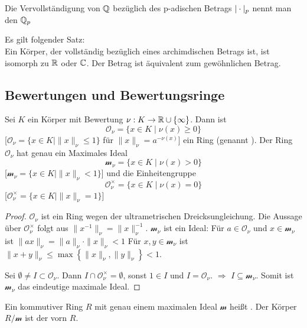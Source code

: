\documentclass[../main.tex]{subfiles}
\begin{document}
\begin{definition}
    Die Vervollständigung von $\mathbb{Q}$ bezüglich des p-adischen Betrags $|\cdot|_p$ nennt man den  $\mathbb{Q}_p$
\end{definition}

\begin{remark}
    Es gilt folgender Satz:\\
    Ein Körper, der vollständig bezüglich eines archimdischen Betrags ist, ist isomorph zu $\mathbb{R}$ oder $\mathbb{C}$. Der Betrag ist äquivalent zum gewöhnlichen Betrag.
\end{remark}

\subsection{Bewertungen und Bewertungsringe}
\begin{theorem}\label{theo:4.23}
    Sei $K$ ein Körper mit Bewertung $\nu:K\rightarrow\mathbb{R}\cup \{\infty\}$.
    Dann ist $$\mathcal{O}_\nu = \{x\in K\mid \nu(x)\geq0\}$$ [$\mathcal{O}_\nu = \{x\in K\mid \|x\|_\nu \leq 1\}$ für $\|x\|_\nu = a^{-\nu(x)}$] ein Ring (genannt ).
    Der Ring $\mathcal{O}_\nu$ hat genau ein Maximales Ideal $$\mathcal{m}_\nu = \{x\in K\mid \nu(x)>0\}$$ [$\mathcal{m}_\nu = \{x\in K\mid \|x\|_\nu <1\}$]
    und die Einheitengruppe $$\mathcal{O}_\nu^\times = \{x\in K\mid \nu(x) = 0\}$$ [$\mathcal{O}_\nu^\times = \{x\in K\mid \|x\|_\nu = 1\}$]
\end{theorem}
\begin{proof}
    $\mathcal{O}_\nu$ ist ein Ring wegen der ultrametrischen Dreicksungleichung.
    Die Aussage über $\mathcal{O}_\nu^\times$ folgt aus $\|x^{-1}\|_\nu = \|x\|_\nu^{-1}$.
    $\mathcal{m}_\nu$ ist ein Ideal: Für $a\in \mathcal{O}_\nu$ und $x\in \mathcal{m}_\nu$ ist $\|ax\|_\nu = \|a\|_\nu \cdot \|x\|_\nu < 1$
    Für $x,y\in \mathcal{m}_\nu$ ist $\|x+y\|_\nu \leq \max\left\{\|x\|_\nu, \|y\|_\nu\right\} < 1$.

    Sei $\emptyset\neq I\subset \mathcal{O}_\nu$. Dann $I\cap \mathcal{O}_\nu^\times = \emptyset$, sonst $1\in I$ und $I=\mathcal{O}_\nu$.
    $\Longrightarrow$ $I\subseteq \mathcal{m}_\nu$.
    Somit ist $\mathcal{m}_\nu$ das eindeutige maximale Ideal.
\end{proof}

\begin{definition}
    Ein kommutiver Ring $R$ mit genau einem maximalen Ideal $\mathcal{m}$ heißt . Der Körper $R/\mathcal{m}$ ist der  vorn $R$.
\end{definition}
\end{document}
